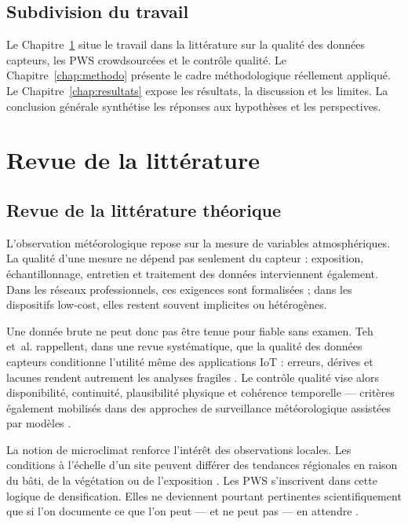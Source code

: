 \documentclass[12pt,a4paper]{report}
\begin{document}
\section*{Subdivision du travail}

Le Chapitre~\ref{chap:litterature} situe le travail dans la littérature sur la
qualité des données capteurs, les PWS crowdsourcées et le contrôle qualité.
Le Chapitre~\ref{chap:methodo} présente le cadre méthodologique réellement
appliqué. Le Chapitre~\ref{chap:resultats} expose les résultats, la discussion
et les limites. La conclusion générale synthétise les réponses aux hypothèses
et les perspectives.

\chapter{Revue de la littérature}
\label{chap:litterature}

\section{Revue de la littérature théorique}

L'observation météorologique repose sur la mesure de variables atmosphériques.
La qualité d'une mesure ne dépend pas seulement du capteur : exposition,
échantillonnage, entretien et traitement des données interviennent également.
Dans les réseaux professionnels, ces exigences sont formalisées ; dans les
dispositifs low-cost, elles restent souvent implicites ou hétérogènes.

Une donnée brute ne peut donc pas être tenue pour fiable sans examen. Teh
et~al. rappellent, dans une revue systématique, que la qualité des données
capteurs conditionne l'utilité même des applications IoT : erreurs, dérives et
lacunes rendent autrement les analyses fragiles \cite{teh2020sensor}. Le
contrôle qualité vise alors disponibilité, continuité, plausibilité physique et
cohérence temporelle --- critères également mobilisés dans des approches de
surveillance météorologique assistées par modèles
\cite{dabrowski2022qc}.

La notion de microclimat renforce l'intérêt des observations locales. Les
conditions à l'échelle d'un site peuvent différer des tendances régionales en
raison du bâti, de la végétation ou de l'exposition
\cite{moon2017microclimate,chithrakumar2023microclimate}. Les PWS s'inscrivent
dans cette logique de densification. Elles ne deviennent pourtant pertinentes
scientifiquement que si l'on documente ce que l'on peut --- et ne peut pas ---
en attendre \cite{devos2019qc}.
\end{document}
